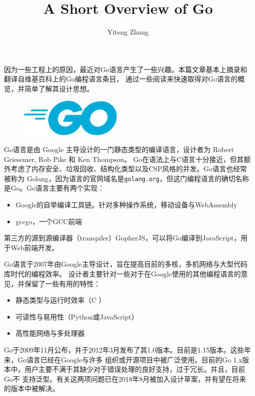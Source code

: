\documentclass[12pt]{article}
\title{A Short Overview of Go}
\author{Yiteng Zhang}
\newcommand{\CC}{C\nolinebreak\hspace{-.05em}\raisebox{.4ex}{\tiny\bf +}%
\nolinebreak\hspace{-.10em}\raisebox{.4ex}{\tiny\bf +}}
\begin{document}
\maketitle

\indent{}因为一些工程上的原因，最近对Go语言产生了一些兴趣。本篇文章基本上摘录和翻译自维基百科上的Go编程语言条目，
通过一些阅读来快速取得对Go语言的概览，并简单了解其设计思想。

\begin{figure}[h]
\centering
\includegraphics[width=5cm]{./imgs/512px-Go_Logo_Blue.svg.png}
\end{figure}

\indent{}Go语言是由 Google 主导设计的一门静态类型的编译语言，设计者为 Robert Griesemer, Rob Pike 和 Ken Thompson。
Go在语法上与C语言十分接近，但其额外考虑了内存安全、垃圾回收、结构化类型以及CSP风格的并发。Go语言也经常被称为
Golang，因为语言的官网域名是\texttt{golang.org}，但这门编程语言的确切名称是Go。Go语言主要有两个实现：

\begin{itemize}
    \item Google的自举编译工具链。针对多种操作系统，移动设备与WebAssembly
    \item gccgo，一个GCC前端
\end{itemize}

\noindent{}第三方的源到源编译器（transpiler）GopherJS，可以将Go编译到JavaScript，用于Web前端开发。

\indent{}Go语言于2007年由Google主导设计，旨在提高目前的多核，多机网络与大型代码库时代的编程效率。
设计者主要针对一些对于在Google使用的其他编程语言的意见，并保留了一些有用的特性：
\begin{itemize}
    \item 静态类型与运行时效率（\CC）
    \item 可读性与易用性（Python或JavaScript）
    \item 高性能网络与多处理器
\end{itemize}

\indent{}Go于2009年11月公布，并于2012年3月发布了其1.0版本。目前是1.15版本。这些年来，Go语言已经在Google与许多
组织或开源项目中被广泛使用。目前的Go 1.x版本中，用户主要不满于其缺少对于错误处理的良好支持，过于冗长。并且，目前Go不
支持泛型。有关这两项问题已在2018年8月被加入设计草案，并有望在将来的版本中被解决。
\end{document}
